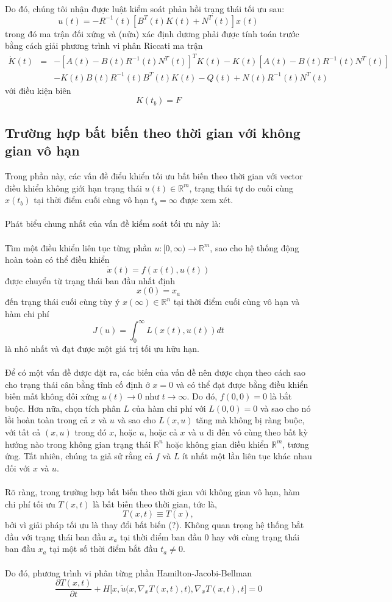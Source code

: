 \documentclass[12pt,a4paper]{report}
\begin{document}
	Do đó, chúng tôi nhận được luật kiểm soát phản hồi trạng thái tối ưu sau: $$u(t) = -R^{-1}(t)[B^T(t)K(t) + N^T(t)]x(t)$$
	trong đó ma trận đối xứng  và (nửa) xác định dương phải được tính toán trước bằng cách giải phương trình vi phân Riccati ma trận
\begin{eqnarray}
	\dot{K}(t) &=& -[A(t) - B(t)R^{-1}(t)N^T(t)]^TK(t) - K(t)[A(t) - B(t)R^{-1}(t)N^T(t)] \nonumber \\ &&-K(t)B(t)R^{-1}(t)B^T(t)K(t) - Q(t) + N(t)R^{-1}(t)N^T(t) \nonumber
\end{eqnarray} với điều kiện biên $$K(t_b) = F$$
\subsection{Trường hợp bất biến theo thời gian với không gian vô hạn}
Trong phần này, các vấn đề điểu khiển tối ưu bất biến theo thời gian với vector điều khiển không giới hạn trạng thái $u(t) \in \mathbb{R}^m$, trạng thái tự do cuối cùng $x(t_b)$ tại thời điểm cuối cùng vô hạn $t_b = \infty$ được xem xét.\\\\Phát biểu chung nhất của vấn đề kiểm soát tối ưu này là:\\\\ 
Tìm một điều khiển liên tục từng phần $u: [0, \infty) \to \mathbb{R}^m$, sao cho hệ thống động hoàn toàn có thể điều khiển $$\dot{x}(t) = f(x(t), u(t))$$ được chuyển từ trạng thái ban đầu nhất định $$x(0) = x_a $$ đến trạng thái cuối cùng tùy ý $x(\infty) \in \mathbb{R}^n$ tại thời điểm cuối cùng vô hạn và hàm chi phí $$J(u) = \int_{0}^{\infty}L(x(t), u(t))dt$$ là nhỏ nhất và đạt được một giá trị tối ưu hữu hạn.	\\\\ Để có một vấn đề được đặt ra, các biến của vấn đề nên được chọn theo cách sao cho trạng thái cân bằng tĩnh cố định ở $x = 0$ và có thể đạt được bằng điều khiển biến mất không đối xứng $u(t) \to 0$ như $t \to \infty$. Do đó, $f(0,0) = 0$ là bắt buộc. Hơn nữa, chọn tích phân $L$ của hàm chi phí với $L(0, 0) = 0$ và sao cho nó lồi hoàn toàn trong cả $x$ và $u$ và sao cho $L (x, u)$ tăng mà không bị ràng buộc, với tất cả $(x, u)$ trong đó $x$, hoặc $u$, hoặc cả $x$ và $u$ đi đến vô cùng theo bất kỳ hướng nào trong không gian trạng thái $\mathbb{R}^n$ hoặc không gian điều khiển $\mathbb{R}^m$, tương ứng. Tất nhiên, chúng ta giả sử rằng cả $f$ và $L$ ít nhất một lần liên tục khác nhau đối với $x$ và $u$. \\\\
Rõ ràng, trong trường hợp bất biến theo thời gian với không gian vô hạn, hàm chi phí tối ưu $T(x, t)$ là bất biến theo thời gian, tức là, $$T(x, t) \equiv T(x) ,$$ bởi vì giải pháp tối ưu là thay đổi bất biến (?). Không quan trọng hệ thống bắt đầu với trạng thái ban đầu $x_a$ tại thời điểm ban đầu 0 hay với cùng trạng thái ban đầu $x_a$ tại một số thời điểm bắt đầu $t_a \neq 0.$ \\\\ Do đó, phương trình vi phân từng phần Hamilton-Jacobi-Bellman $$\frac{\partial T(x, t)}{\partial t} + H\Big[x, \tilde{u}\Big(x, \nabla_xT(x,t),t\Big), \nabla_xT(x, t), t\Big] = 0$$
\end{document}
